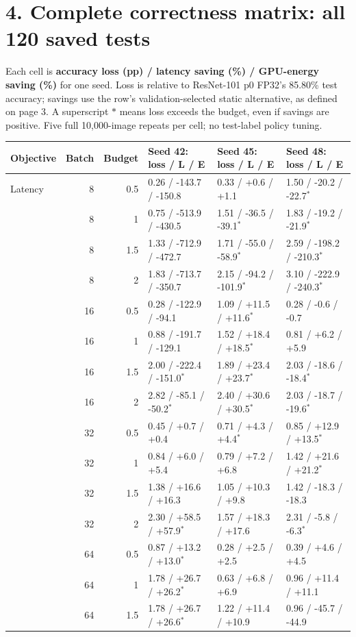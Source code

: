 \documentclass[10pt,a4paper]{article}
\renewcommand{\arraystretch}{1.13}
\newcommand{\pagehead}[1]{\section*{#1}}
\begin{document}
\newpage
\pagehead{4. Complete correctness matrix: all 120 saved tests}
{\small Each cell is \textbf{accuracy loss (pp) / latency saving (\%) / GPU-energy saving (\%)} for one seed. Loss is relative to ResNet-101 p0 FP32's 85.80\% test accuracy; savings use the row's validation-selected static alternative, as defined on page 3. A superscript $*$ means loss exceeds the budget, even if savings are positive. Five full 10,000-image repeats per cell; no test-label policy tuning.}
\begin{center}
\footnotesize\renewcommand{\arraystretch}{1.14}
\begin{tabular}{@{}lrrlll@{}}
\toprule Objective &Batch&Budget& Seed 42: loss / L / E & Seed 45: loss / L / E & Seed 48: loss / L / E\\
\midrule
Latency&8&0.5&0.26 / -143.7 / -150.8&0.33 / +0.6 / +1.1&1.50 / -20.2 / -22.7$^*$\\
&8&1&0.75 / -513.9 / -430.5&1.51 / -36.5 / -39.1$^*$&1.83 / -19.2 / -21.9$^*$\\
&8&1.5&1.33 / -712.9 / -472.7&1.71 / -55.0 / -58.9$^*$&2.59 / -198.2 / -210.3$^*$\\
&8&2&1.83 / -713.7 / -350.7&2.15 / -94.2 / -101.9$^*$&3.10 / -222.9 / -240.3$^*$\\
&16&0.5&0.28 / -122.9 / -94.1&1.09 / +11.5 / +11.6$^*$&0.28 / -0.6 / -0.7\\
&16&1&0.88 / -191.7 / -129.1&1.52 / +18.4 / +18.5$^*$&0.81 / +6.2 / +5.9\\
&16&1.5&2.00 / -222.4 / -151.0$^*$&1.89 / +23.4 / +23.7$^*$&2.03 / -18.6 / -18.4$^*$\\
&16&2&2.82 / -85.1 / -50.2$^*$&2.40 / +30.6 / +30.5$^*$&2.03 / -18.7 / -19.6$^*$\\
&32&0.5&0.45 / +0.7 / +0.4&0.71 / +4.3 / +4.4$^*$&0.85 / +12.9 / +13.5$^*$\\
&32&1&0.84 / +6.0 / +5.4&0.79 / +7.2 / +6.8&1.42 / +21.6 / +21.2$^*$\\
&32&1.5&1.38 / +16.6 / +16.3&1.05 / +10.3 / +9.8&1.42 / -18.3 / -18.3\\
&32&2&2.30 / +58.5 / +57.9$^*$&1.57 / +18.3 / +17.6&2.31 / -5.8 / -6.3$^*$\\
&64&0.5&0.87 / +13.2 / +13.0$^*$&0.28 / +2.5 / +2.5&0.39 / +4.6 / +4.5\\
&64&1&1.78 / +26.7 / +26.2$^*$&0.63 / +6.8 / +6.9&0.96 / +11.4 / +11.1\\
&64&1.5&1.78 / +26.7 / +26.6$^*$&1.22 / +11.4 / +10.9&0.96 / -45.7 / -44.9\\

\end{tabular}
\end{center}
\end{document}
